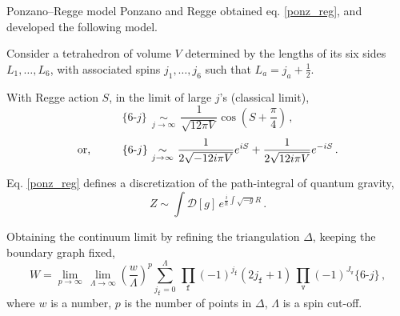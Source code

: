 \documentclass[12pt,titlepage]{article}
\DeclareMathOperator*{\opsim}{\,\sim\,}
\begin{document}
\begin{frame}{Ponzano–Regge model}
    Ponzano and Regge obtained eq. \ref{ponz_reg}, and developed the following model.
    \begin{list}{\,}{\leftmargin=1em \itemindent=0em}
        \item<1-> Consider a tetrahedron of volume $V$ determined by the lengths of its six sides $L_1,\dots,L_6$, with associated spins $j_1,\dots,j_6$ such that $L_a=j_a+\frac{1}{2}$.
        \item<2-> With Regge action $S$, in the limit of large $j$'s (classical limit),\vspace{-3pt}
        \begin{equation}
            \{6\text{-}j\}\,\opsim\limits_{j\to\infty}\,\frac{1}{\sqrt{12\pi V}}\cos{\left(S+\frac{\pi}{4}\right)}\,,
        \end{equation}
        \begin{equation}
            \text{or,\,\,\,\,\,\,\,\,\,\,\,\,\,\,\,\,\,}\{6\text{-}j\}\,\opsim\limits_{j\to\infty}\,\frac{1}{2\sqrt{-12i\pi V}}e^{iS}+\frac{1}{2\sqrt{12i\pi V}}e^{-iS}\,.
        \end{equation}
        \item<3-> Eq. \ref{ponz_reg} defines a discretization of the path-integral of quantum gravity,\vspace{-3pt}
        \begin{equation}
            Z\sim\int\mathcal{D}[g]\,e^{\frac{i}{\hbar}\int\sqrt{-g}R}\,.
        \end{equation}
        \item<4-> Obtaining the continuum limit by refining the triangulation $\Delta$, keeping the boundary graph fixed,\vspace{-4pt}
        \begin{equation}
            W=\lim_{p\to\infty}\,\lim_{\Lambda\to\infty}\left(\frac{w}{\Lambda}\right)^p\sum_{j_\mathtt{f}=0}^\Lambda\,\prod_\mathtt{f}(-1)^{j_\mathtt{f}}(2j_\mathtt{f}+1)\,\prod_\mathtt{v}(-1)^{J_\mathtt{v}}\{6\text{-}j\}\,,
        \end{equation}
        where $w$ is a number, $p$ is the number of points in $\Delta$, $\Lambda$ is a spin cut-off.
    \end{list}
\end{frame}
\end{document}
